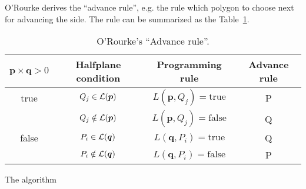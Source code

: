 O'Rourke derives the ``advance rule'', e.g. the rule which polygon to
choose next for advancing the side. The rule can be summarized as the
Table~\ref{tab:arule}.
%
\begin{table}
  \center
  \caption{O'Rourke's ``Advance rule''.}
  \begin{tabular}{c|c|c|c}
    \hline
    $\bm{p}\times\bm{q} > 0$ & Halfplane condition & Programming rule & Advance rule \\
    \hline
    true & $Q_j\in {\cal L}(\bm{p})$     & $L(\bm{p},Q_j)=\text{true}$ & P \\
         & $Q_j\notin {\cal L}(\bm{p})$  & $L(\bm{p},Q_j)=\text{false}$ & Q \\
    \hline
    false & $P_i\in {\cal L}(\bm{q})$    & $L(\bm{q},P_i)=\text{true}$ & Q \\
          & $P_i\notin {\cal L}(\bm{q})$ & $L(\bm{q},P_i)=\text{false}$ & P \\
    \hline
  \end{tabular}
  \label{tab:arule}
\end{table}

The algorithm
